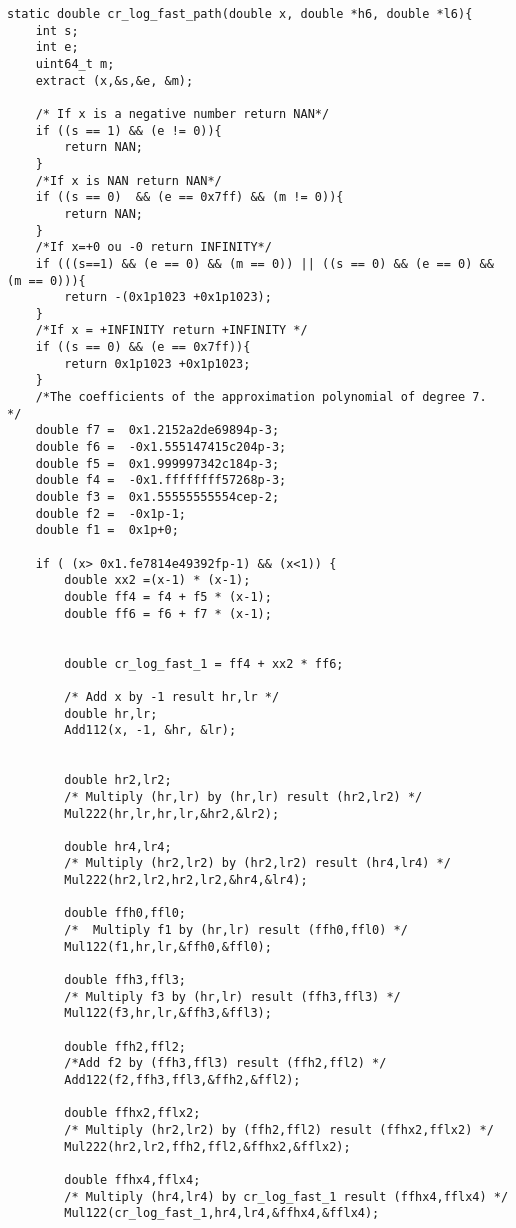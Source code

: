 \begin{lstlisting}
static double cr_log_fast_path(double x, double *h6, double *l6){ 
    int s;
    int e;
    uint64_t m;
    extract (x,&s,&e, &m);
    
    /* If x is a negative number return NAN*/
    if ((s == 1) && (e != 0)){
        return NAN;
    }
    /*If x is NAN return NAN*/
    if ((s == 0)  && (e == 0x7ff) && (m != 0)){
        return NAN;
    }
    /*If x=+0 ou -0 return INFINITY*/
    if (((s==1) && (e == 0) && (m == 0)) || ((s == 0) && (e == 0) && (m == 0))){
        return -(0x1p1023 +0x1p1023);
    }
    /*If x = +INFINITY return +INFINITY */
    if ((s == 0) && (e == 0x7ff)){
        return 0x1p1023 +0x1p1023;
    }
    /*The coefficients of the approximation polynomial of degree 7.  */
    double f7 =  0x1.2152a2de69894p-3;
    double f6 =  -0x1.555147415c204p-3;
    double f5 =  0x1.999997342c184p-3;
    double f4 =  -0x1.ffffffff57268p-3;
    double f3 =  0x1.55555555554cep-2;
    double f2 =  -0x1p-1;
    double f1 =  0x1p+0;

    if ( (x> 0x1.fe7814e49392fp-1) && (x<1)) {
        double xx2 =(x-1) * (x-1);
        double ff4 = f4 + f5 * (x-1);
        double ff6 = f6 + f7 * (x-1);
        

        double cr_log_fast_1 = ff4 + xx2 * ff6;

        /* Add x by -1 result hr,lr */
        double hr,lr;
        Add112(x, -1, &hr, &lr);

        
        double hr2,lr2;
        /* Multiply (hr,lr) by (hr,lr) result (hr2,lr2) */
        Mul222(hr,lr,hr,lr,&hr2,&lr2);

        double hr4,lr4;
        /* Multiply (hr2,lr2) by (hr2,lr2) result (hr4,lr4) */
        Mul222(hr2,lr2,hr2,lr2,&hr4,&lr4);

        double ffh0,ffl0;
        /*  Multiply f1 by (hr,lr) result (ffh0,ffl0) */
        Mul122(f1,hr,lr,&ffh0,&ffl0);

        double ffh3,ffl3;
        /* Multiply f3 by (hr,lr) result (ffh3,ffl3) */
        Mul122(f3,hr,lr,&ffh3,&ffl3);

        double ffh2,ffl2;
        /*Add f2 by (ffh3,ffl3) result (ffh2,ffl2) */
        Add122(f2,ffh3,ffl3,&ffh2,&ffl2);

        double ffhx2,fflx2;
        /* Multiply (hr2,lr2) by (ffh2,ffl2) result (ffhx2,fflx2) */
        Mul222(hr2,lr2,ffh2,ffl2,&ffhx2,&fflx2);

        double ffhx4,fflx4;
        /* Multiply (hr4,lr4) by cr_log_fast_1 result (ffhx4,fflx4) */
        Mul122(cr_log_fast_1,hr4,lr4,&ffhx4,&fflx4);


\end{lstlisting}
